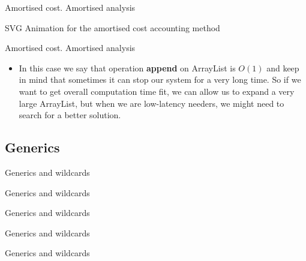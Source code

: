 \documentclass{beamer}
\begin{document}
\begin{frame}{Amortised cost. Amortised analysis}
\begin{center}
    SVG Animation for the amortised cost accounting method
\end{center}
\end{frame}

\begin{frame}{Amortised cost. Amortised analysis}

\begin{itemize}
\item In this case we say that operation \textbf{append} on ArrayList is $O(1)$ and keep in mind that sometimes it can stop our system for a very long time. So if we want to get overall computation time fit, we can allow us to expand a very large ArrayList, but when we are low-latency needers, we might need to search for a better solution.
\end{itemize}

\end{frame}

\subsection{Generics}
\lstset{style=srcnarrow}
\begin{frame}[fragile]{Generics and wildcards}
    
\end{frame}

\begin{frame}[fragile]{Generics and wildcards}
    
\end{frame}

\begin{frame}[fragile]{Generics and wildcards}
    
\end{frame}

\begin{frame}[fragile]{Generics and wildcards}
    
\end{frame}

\begin{frame}[fragile]{Generics and wildcards}
    
\end{frame}
\end{document}
